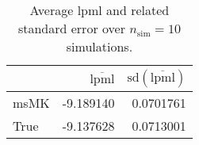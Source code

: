 \begin{table}[H]

\caption{Average lpml and related standard error over $n_{\text{sim}} = 10$ simulations.}
\centering
\begin{tabular}[t]{lrr}
\toprule
  & $\overbar{\text{lpml}}$ & $\text{sd}(\overbar{\text{lpml}})$\\
\midrule
msMK & -9.189140 & 0.0701761\\
True & -9.137628 & 0.0713001\\
\bottomrule
\end{tabular}
\end{table}